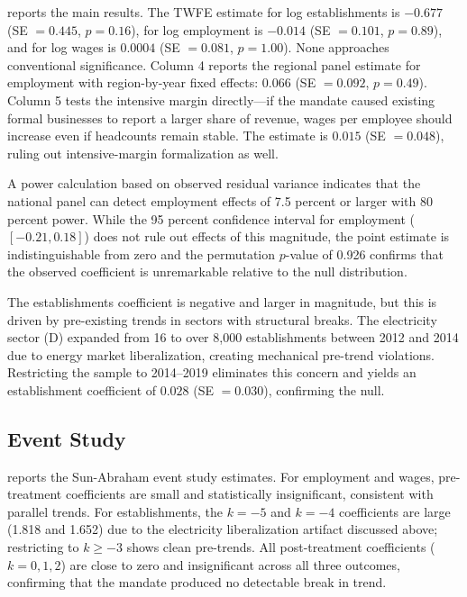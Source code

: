 \documentclass[12pt]{article}
\begin{document}


 reports the main results. The TWFE estimate for log establishments is $-0.677$ (SE $= 0.445$, $p = 0.16$), for log employment is $-0.014$ (SE $= 0.101$, $p = 0.89$), and for log wages is $0.0004$ (SE $= 0.081$, $p = 1.00$). None approaches conventional significance. Column 4 reports the regional panel estimate for employment with region-by-year fixed effects: $0.066$ (SE $= 0.092$, $p = 0.49$). Column 5 tests the intensive margin directly---if the mandate caused existing formal businesses to report a larger share of revenue, wages per employee should increase even if headcounts remain stable. The estimate is $0.015$ (SE $= 0.048$), ruling out intensive-margin formalization as well.

A power calculation based on observed residual variance indicates that the national panel can detect employment effects of 7.5 percent or larger with 80 percent power. While the 95 percent confidence interval for employment ($[-0.21, 0.18]$) does not rule out effects of this magnitude, the point estimate is indistinguishable from zero and the permutation $p$-value of 0.926 confirms that the observed coefficient is unremarkable relative to the null distribution.

The establishments coefficient is negative and larger in magnitude, but this is driven by pre-existing trends in sectors with structural breaks. The electricity sector (D) expanded from 16 to over 8,000 establishments between 2012 and 2014 due to energy market liberalization, creating mechanical pre-trend violations. Restricting the sample to 2014--2019 eliminates this concern and yields an establishment coefficient of $0.028$ (SE $= 0.030$), confirming the null.

\subsection{Event Study}



 reports the Sun-Abraham event study estimates. For employment and wages, pre-treatment coefficients are small and statistically insignificant, consistent with parallel trends. For establishments, the $k = -5$ and $k = -4$ coefficients are large (1.818 and 1.652) due to the electricity liberalization artifact discussed above; restricting to $k \geq -3$ shows clean pre-trends. All post-treatment coefficients ($k = 0, 1, 2$) are close to zero and insignificant across all three outcomes, confirming that the mandate produced no detectable break in trend.
\end{document}
